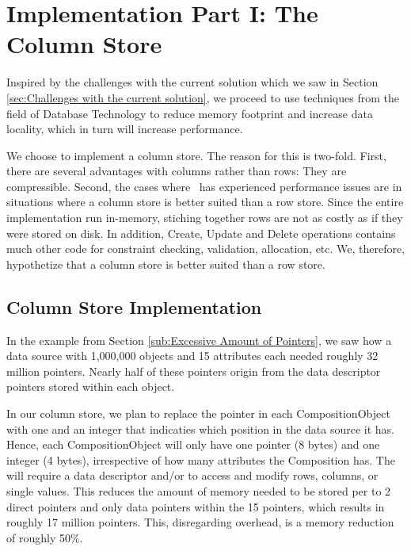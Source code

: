 \chapter{Implementation Part I: The Column Store}
\label{chap:Implementation Part I: The Column Store}
Inspired by the challenges with the current solution which we saw in Section \ref{sec:Challenges with the current solution}, we proceed to use techniques from the field of Database Technology to reduce memory footprint and increase data locality, which in turn will increase performance. 

We choose to implement a column store. The reason for this is two-fold. First, there are several advantages with columns rather than rows: They are compressible. Second, the cases where \genus~has experienced performance issues are in situations where a column store is better suited than a row store. Since the entire implementation run in-memory, stiching together rows are not as costly as if they were stored on disk. In addition, Create, Update and Delete operations contains much other code for constraint checking, validation, allocation, etc. We, therefore, hypothetize that a column store is better suited than a row store.

\section{Column Store Implementation}
\label{sec:Column Store Implementation}
In the example from Section \ref{sub:Excessive Amount of Pointers}, we saw how a data source with 1,000,000 objects and 15 attributes each needed roughly 32 million pointers. Nearly half of these pointers origin from the data descriptor pointers stored within each object.

In our column store, we plan to replace the  pointer in each CompositionObject with one  and an integer  that indicaties which position in the data source it has. Hence, each CompositionObject will only have one pointer (8 bytes) and one integer (4 bytes), irrespective of how many attributes the Composition has. The  will require a data descriptor and/or  to access and modify rows, columns, or single values. This reduces the amount of memory needed to be stored per  to 2 direct pointers and only data pointers within the  15 pointers, which results in roughly 17 million pointers. This, disregarding overhead, is a memory reduction of roughly 50\%.


